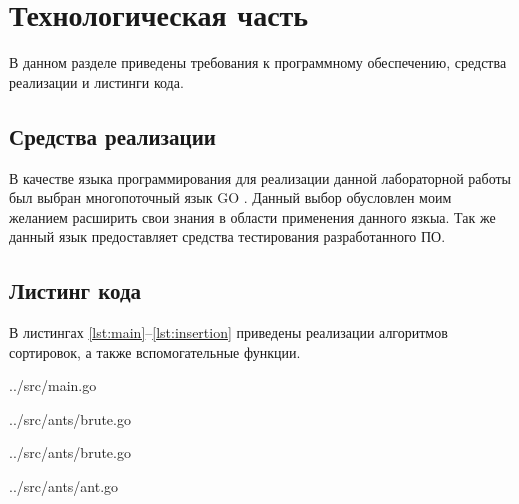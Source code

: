 \chapter{Технологическая часть}

В данном разделе приведены требования к программному обеспечению, средства реализации и листинги кода.

\section{Средства реализации}

В качестве языка программирования для реализации данной лабораторной работы был выбран многопоточный язык GO \cite{golang}. Данный выбор обусловлен моим желанием расширить свои знания в области применения данного язкыа. Так же данный язык предоставляет средства тестирования разработанного ПО.

\section{Листинг кода}

В листингах \ref{lst:main}--\ref{lst:insertion} приведены реализации алгоритмов сортировок, а также вспомогательные функции.


\captionsetup{singlelinecheck = false, justification=raggedright}

\begin{lstinputlisting}[
	caption={Основной модуль программы},
	label={lst:main},
	style={go},
	linerange={8-27},
	]{../src/main.go}
\end{lstinputlisting}
\clearpage

\begin{lstinputlisting}[
	caption={Алгоритм полного перебора - Часть 1},
	label={lst:brute1},
	style={go},
	linerange={3-49},
	]{../src/ants/brute.go}
\end{lstinputlisting}
\clearpage

\begin{lstinputlisting}[
	caption={Алгоритм полного перебора - Часть 2},
	label={lst:brute2},
	style={go},
	linerange={51-64},
	]{../src/ants/brute.go}
\end{lstinputlisting}

\begin{lstinputlisting}[
	caption={Муравьиный алгоритм - Часть 1},
	label={lst:ant1},
	style={go},
	linerange={17-38},
	]{../src/ants/ant.go}
\end{lstinputlisting}

